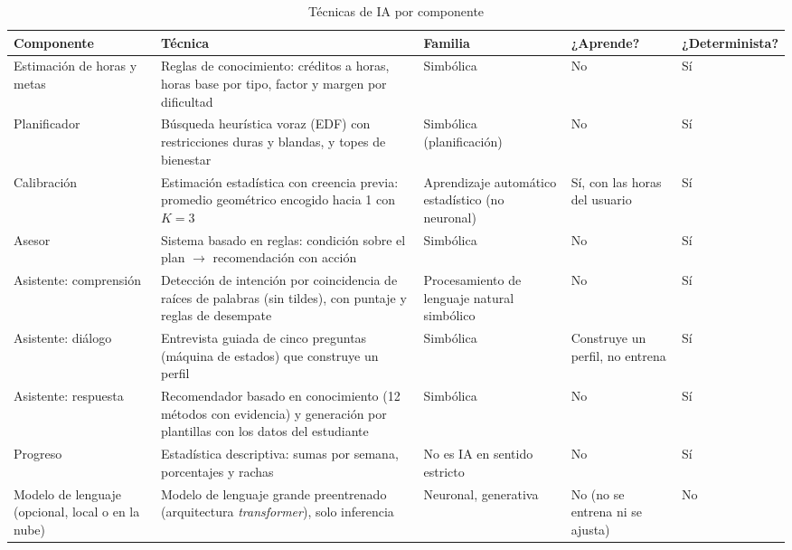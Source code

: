 \begin{table}[H]
\centering\small
\caption{Técnicas de IA por componente}\label{tab:tecnicas-ia}
\begin{tabularx}{\textwidth}{>{\raggedright\arraybackslash}p{2.7cm} >{\raggedright\arraybackslash}X >{\raggedright\arraybackslash}p{2.4cm} >{\centering\arraybackslash}p{1.6cm} >{\centering\arraybackslash}p{2.1cm}}
\toprule
Componente & Técnica & Familia & ¿Aprende? & ¿Determinista? \\
\midrule
Estimación de horas y metas & Reglas de conocimiento: créditos a horas, horas base por tipo, factor y margen por dificultad & Simbólica & No & Sí \\
Planificador & Búsqueda heurística voraz (EDF) con restricciones duras y blandas, y topes de bienestar & Simbólica (planificación) & No & Sí \\
Calibración & Estimación estadística con creencia previa: promedio geométrico encogido hacia 1 con $K=3$ & Aprendizaje automático estadístico (no neuronal) & Sí, con las horas del usuario & Sí \\
Asesor & Sistema basado en reglas: condición sobre el plan $\rightarrow$ recomendación con acción & Simbólica & No & Sí \\
Asistente: comprensión & Detección de intención por coincidencia de raíces de palabras (sin tildes), con puntaje y reglas de desempate & Procesamiento de lenguaje natural simbólico & No & Sí \\
Asistente: diálogo & Entrevista guiada de cinco preguntas (máquina de estados) que construye un perfil & Simbólica & Construye un perfil, no entrena & Sí \\
Asistente: respuesta & Recomendador basado en conocimiento (12 métodos con evidencia) y generación por plantillas con los datos del estudiante & Simbólica & No & Sí \\
Progreso & Estadística descriptiva: sumas por semana, porcentajes y rachas & No es IA en sentido estricto & No & Sí \\
Modelo de lenguaje (opcional, local o en la nube) & Modelo de lenguaje grande preentrenado (arquitectura \emph{transformer}), solo inferencia & Neuronal, generativa & No (no se entrena ni se ajusta) & No \\
\bottomrule
\end{tabularx}
\end{table}

